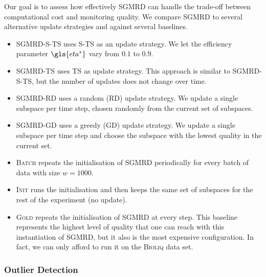 Our goal is to assess how effectively \gls{SGMRD} can handle the trade-off between computational cost and monitoring quality. We compare \gls{SGMRD} to several alternative update strategies and against several baselines.
\begin{itemize}[noitemsep]
	\item \textsc{\gls{SGMRD}-S-TS} uses \acrfull{S-TS} as an update strategy. We let the efficiency parameter $\gls{eta^*}$ vary from $0.1$ to $0.9$.
	\item \textsc{\gls{SGMRD}-\acrshort{TS}} uses \gls{TS} as update strategy. This approach is similar to \textsc{\gls{SGMRD}-S-TS}, but the number of updates does not change over time.  
	\item \textsc{{SGMRD}-RD} uses a random (RD) update strategy. We update a single subspace per time step, chosen randomly from the current set of subspaces. 
	\item \textsc{{SGMRD}-GD} uses a greedy (GD) update strategy. We update a single subspace per time step and choose the subspace with the lowest quality in the current set. 
	\item \textsc{Batch} repeats the initialisation of \gls{SGMRD} periodically for every batch of data with size ${w}=1000$. 
	\item \textsc{Init} runs the initialisation and then keeps the same set of subspaces for the rest of the experiment (no update). 
	\item \textsc{Gold} repeats the initialisation of \gls{SGMRD} at every step. This baseline represents the highest level of quality that one can reach with this instantiation of \gls{SGMRD}, but it also is the most expensive configuration. 
	In fact, we can only afford to run it on the \textsc{Bioliq} data set.  
\end{itemize}

\subsubsection{Outlier Detection} 

